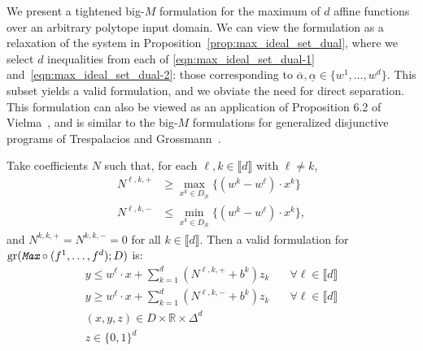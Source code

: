 \documentclass[smallextended]{svjour3}
\newcommand{\bbR}{\mathbb{R}}
\newcommand{\gr}{\operatorname{gr}}
\newcommand{\Max}{\texttt{Max}}
\newcommand{\ubar}[1]{\underline{#1}}
\renewcommand{\bar}[1]{\overline{#1}}
\begin{document}
We present a tightened big-$M$ formulation for the maximum of $d$ affine functions over an arbitrary polytope input domain. We can view the formulation as a relaxation of the system in Proposition~\ref{prop:max_ideal_set_dual}, where we select $d$ inequalities from each of \eqref{eqn:max_ideal_set_dual-1} and~\eqref{eqn:max_ideal_set_dual-2}: those corresponding to $\bar{\alpha}, \ubar{\alpha} \in \{ w^1, \ldots, w^d \}$. This subset yields a valid formulation, and we obviate the need for direct separation. This formulation can also be viewed as an application of Proposition 6.2 of Vielma~\cite{Vielma:2015}, and is similar to the big-$M$ formulations for generalized disjunctive programs of Trespalacios and Grossmann~\cite{Trespalacios:2014}.

\begin{proposition}\label{prop:max_big_m}
Take coefficients $N$ such that, for each $\ell, k \in \llbracket d \rrbracket$ with $\ell \neq k$,
    \begin{subequations} \label{eqn:optimal-coefficients_app}
    \begin{align}
        N^{\ell,k,+} &\geq \max_{x^k \in D_{|k}}\{(w^k - w^\ell) \cdot x^k\} \label{eqn:optimal-coefficients-1_app}\\
        N^{\ell,k,-} &\leq \min_{x^k \in D_{|k}}\{(w^k - w^\ell) \cdot x^k\} ,\label{eqn:optimal-coefficients-2_app}
    \end{align}
    \end{subequations}
and $N^{k,k,+} = N^{k,k,-} = 0$ for all $k \in \llbracket d \rrbracket$. Then a valid formulation for $\gr(\emph{\Max{}} \circ (f^1,\ldots,f^d); D)$ is:
\begin{subequations}\label{eqn:max_big_m_app}
\begin{align}
    y \leq w^\ell \cdot x + \sum_{k=1}^d (N^{\ell,k,+} + b^k) z_k&\quad\forall \ell \in \llbracket d \rrbracket\label{eqn:max_big_m-1_app}\\
    y \geq w^\ell \cdot x + \sum_{k=1}^d (N^{\ell,k,-} + b^k) z_k&\quad\forall \ell \in \llbracket d \rrbracket\label{eqn:max_big_m-2_app}\\
    (x,y,z) \in D \times \bbR \times \Delta^d \label{eqn:max_big_m-3_app} \\
    z \in \{0,1\}^d\label{eqn:max_big_m-4_app}
\end{align}
\end{subequations}
\end{proposition}
\end{document}
